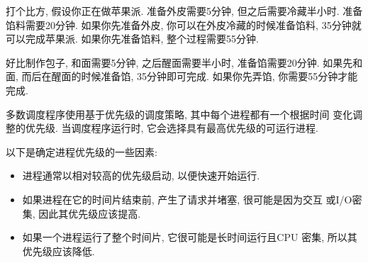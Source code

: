 \documentclass[12pt]{book}
\begin{document}
{\begin{itemize}
打个比方, 假设你正在做苹果派. 准备外皮需要5分钟, 但之后需要冷藏半小时. 准备馅料需要20分钟. 如果你先准备外皮, 你可以在外皮冷藏的时候准备馅料, 35分钟就可以完成苹果派. 如果你先准备馅料, 整个过程需要55分钟. 

\begin{note}
好比制作包子, 和面需要5分钟, 之后醒面需要半小时, 准备馅需要20分钟. 如果先和面, 而后在醒面的时候准备馅, 35分钟即可完成. 如果你先弄馅, 你需要55分钟才能完成.
\end{note}

\end{itemize}

多数调度程序使用基于优先级的调度策略, 其中每个进程都有一个根据时间
变化调整的优先级. 当调度程序运行时, 它会选择具有最高优先级的可运行进程.  

以下是确定进程优先级的一些因素: 

\begin{itemize}

\item 进程通常以相对较高的优先级启动, 以便快速开始运行.

\item 如果进程在它的时间片结束前, 产生了请求并堵塞, 很可能是因为交互
或I/O密集, 因此其优先级应该提高.

\item 如果一个进程运行了整个时间片, 它很可能是长时间运行且CPU
密集, 所以其优先级应该降低.



\end{itemize}}
\end{document}
